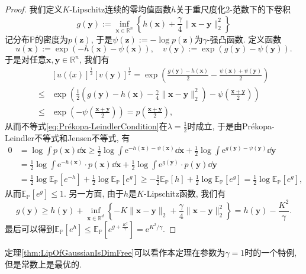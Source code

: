 \begin{proof}
	我们定义$K$-Lipschitz连续的零均值函数$h$关于重尺度化$2$-范数下的下卷积
	\begin{equation*}
		g(\bm{y}) 
		:= \inf_{\bm{x} \in \mathbb{R}^n} \left\{ h(\bm{x}) + \frac{\gamma}{4} \|\bm{x} - \bm{y}\|_2^2 \right\}
	\end{equation*}
	记分布$\mathbb{P}$的密度为$p(\bm{z})$, 于是$\psi(\bm{z}) := - \log p(\bm{z})$为$\gamma$-强凸函数. 
	定义函数
	\begin{equation*}
		u(\bm{x}) := \exp(-h(\bm{x}) - \psi(\bm{x})), \quad
		v(\bm{y}) := \exp(g(\bm{y}) - \psi(\bm{y})).  
	\end{equation*}
	于是对任意$\bm{x}, \bm{y} \in \mathbb{R}^n$, 我们有
	\begin{align*}
		&[u(\bm(x)]^{\frac12} [v(\bm{y})]^{\frac12}
		= \exp\left( \frac{g(\bm{y}) - h(\bm{x})}{2} - \frac{\psi(\bm{x}) + \psi(\bm{y})}{2} \right) \\
		\leq & \exp\left( \frac{1}{2} \left( g(\bm{y}) - h(\bm{x}) - \frac{\gamma}{4} \|\bm{x} - \bm{y}\|_2^2 \right) - \psi\left(\frac{\bm{x} + \bm{y}}{2}\right)  \right) \\
		\leq & \exp\left(-\psi\left(\frac{\bm{x} + \bm{y}}{2}\right)\right) 
		= p\left(\frac{\bm{x} + \bm{y}}{2}\right), 
	\end{align*}
	从而不等式\eqref{eq:Prékopa-LeindlerCondition}在$\lambda = \frac{1}{2}$时成立, 于是由Prékopa-Leindler不等式和Jensen不等式, 有
	\begin{align*}
		0 
		&= \log \int p(\bm{x}) \dd \bm{x}
		\geq \frac{1}{2} \log \int \mathrm{e}^{-h(\bm{x}) - \psi(\bm{x})} \dd \bm{x} + \frac{1}{2} \log \int \mathrm{e}^{g(\bm{y}) - \psi(\bm{y})} \dd \bm{y} \\
		&= \frac{1}{2} \log \int \mathrm{e}^{-h(\bm{x})} \cdot p(\bm{x}) \dd \bm{x} + \frac{1}{2} \log \int \mathrm{e}^{g(\bm{y})} \cdot p(\bm{y}) \dd \bm{y} \\
		&= \frac{1}{2} \log \mathbb{E}_{\mathbb{P}}[e^{-h}] + \frac{1}{2} \log \mathbb{E}_{\mathbb{P}}[e^{g}] 
		\geq - \frac{1}{2} \mathbb{E}_{\mathbb{P}}[h] +  \frac{1}{2} \log \mathbb{E}_{\mathbb{P}}[e^{g}]
		=  \frac{1}{2} \log \mathbb{E}_{\mathbb{P}}[e^{g}],  
	\end{align*}
	从而$\mathbb{E}_{\mathbb{P}}[e^{g}] \leq 1$. 
	另一方面, 由于$h$是$K$-Lipschitz函数, 我们有
	\begin{equation*}
		g(\bm{y})
		\geq h(\bm{y}) + \inf_{\bm{x} \in \mathbb{R}^d} \left\{ -K \|\bm{x} - \bm{y}\|_2 + \frac{\gamma}{4} \|\bm{x} - \bm{y}\|_2^2 \right\}
		= h(\bm{y}) - \frac{K^2}{\gamma}. 
	\end{equation*}
	最后可以得到$\mathbb{E}_{\mathbb{P}}[e^h] \leq \mathbb{E}_{\mathbb{P}}[e^{g + \frac{K^2}{\gamma}}] = \mathrm{e}^{K^2 / \gamma}$. 
\end{proof}
\begin{remark}
	定理\ref{thm:LipOfGaussianIsDimFree}可以看作本定理在参数为$\gamma = 1$时的一个特例, 但是常数上是最优的. 
\end{remark}


